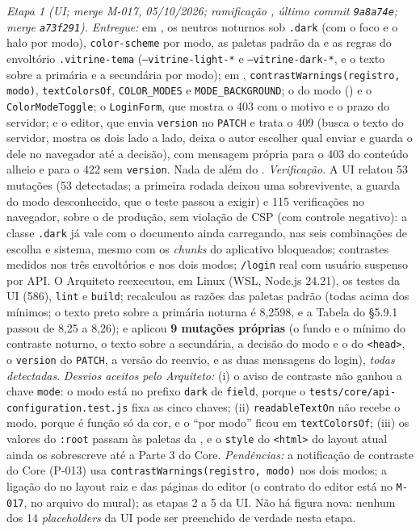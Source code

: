 \emph{Etapa 1 (UI; merge M-017, 05/10/2026; ramificação , último commit \texttt{9a8a74e}; merge \texttt{a73f291}).} \emph{Entregue:} em , os neutros noturnos sob \texttt{.dark} (com o foco e o halo por modo), \texttt{color-scheme} por modo, as paletas padrão da  e as regras do envoltório \texttt{.vitrine-tema} (\texttt{--vitrine-light-*} e \texttt{--vitrine-dark-*}, e o texto sobre a primária e a secundária por modo); em , \texttt{contrastWarnings(registro, modo)}, \texttt{textColorsOf}, \texttt{COLOR\_MODES} e \texttt{MODE\_BACKGROUND}; o  do modo () e o \texttt{ColorModeToggle}; o \texttt{LoginForm}, que mostra o 403  com o motivo e o prazo do servidor; e o editor, que envia \texttt{version} no \texttt{PATCH} e trata o 409  (busca o texto do servidor, mostra os dois lado a lado, deixa o autor escolher qual enviar e guarda o dele no navegador até a decisão), com mensagem própria para o 403 do conteúdo alheio e para o 422 sem \texttt{version}. Nada de  além do . \emph{Verificação.} A UI relatou 53 mutações (53 detectadas; a primeira rodada deixou uma sobrevivente, a guarda do modo desconhecido, que o teste passou a exigir) e 115 verificações no navegador, sobre o  de produção, sem violação de CSP (com controle negativo): a classe \texttt{.dark} já vale com o documento ainda carregando, nas seis combinações de escolha e sistema, mesmo com os \emph{chunks} do aplicativo bloqueados; contrastes medidos nos três envoltórios e nos dois modos; \texttt{/login} real com usuário suspenso por API. O Arquiteto reexecutou, em Linux (WSL, Node.js 24.21), os testes da UI (586), \texttt{lint} e \texttt{build}; recalculou as razões das paletas padrão (todas acima dos mínimos; o texto preto sobre a primária noturna é 8,2598, e a Tabela do \S5.9.1 passou de 8,25 a 8,26); e aplicou \textbf{9 mutações próprias} (o fundo e o mínimo do contraste noturno, o texto sobre a secundária, a decisão do modo e o  do \texttt{<head>}, o \texttt{version} do \texttt{PATCH}, a versão do reenvio, e as duas mensagens do login), \emph{todas detectadas}. \emph{Desvios aceitos pelo Arquiteto:} (i) o aviso de contraste não ganhou a chave \texttt{mode}: o modo está no prefixo \texttt{dark} de \texttt{field}, porque o \texttt{tests/core/api-configuration.test.js} fixa as cinco chaves; (ii) \texttt{readableTextOn} não recebe o modo, porque é função só da cor, e o ``por modo'' ficou em \texttt{textColorsOf}; (iii) os valores do \texttt{:root} passam às paletas da , e o \texttt{style} do \texttt{<html>} do layout atual ainda os sobrescreve até a Parte 3 do Core. \emph{Pendências:} a notificação de contraste do Core (P-013) usa \texttt{contrastWarnings(registro, modo)} nos dois modos; a ligação do  no layout raiz e das páginas do editor (o contrato do editor está no \texttt{M-017}, no arquivo do mural); as etapas 2 a 5 da UI. Não há figura nova: nenhum dos 14 \emph{placeholders} da UI pode ser preenchido de verdade nesta etapa.


